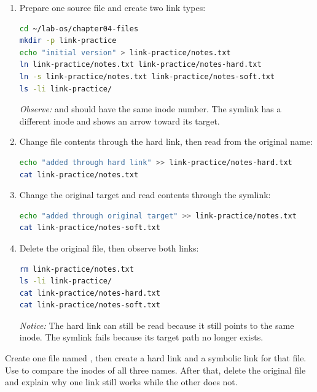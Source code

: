 \begin{enumerate}
    \item Prepare one source file and create two link types:
\begin{lstlisting}[language=bash, caption={Creating a hard link and symbolic link}]
cd ~/lab-os/chapter04-files
mkdir -p link-practice
echo "initial version" > link-practice/notes.txt
ln link-practice/notes.txt link-practice/notes-hard.txt
ln -s link-practice/notes.txt link-practice/notes-soft.txt
ls -li link-practice/
\end{lstlisting}
    \textit{Observe:}  and  should have the same inode number. The symlink has a different inode and shows an arrow toward its target.

    \item Change file contents through the hard link, then read from the original name:
\begin{lstlisting}[language=bash, caption={Changing contents through a hard link}]
echo "added through hard link" >> link-practice/notes-hard.txt
cat link-practice/notes.txt
\end{lstlisting}

    \item Change the original target and read contents through the symlink:
\begin{lstlisting}[language=bash, caption={Reading a target through a symbolic link}]
echo "added through original target" >> link-practice/notes.txt
cat link-practice/notes-soft.txt
\end{lstlisting}

    \item Delete the original file, then observe both links:
\begin{lstlisting}[language=bash, caption={Deleting the original target}]
rm link-practice/notes.txt
ls -li link-practice/
cat link-practice/notes-hard.txt
cat link-practice/notes-soft.txt
\end{lstlisting}
    \textit{Notice:} The hard link can still be read because it still points to the same inode. The symlink fails because its target path no longer exists.
\end{enumerate}

\begin{challengebox}
Create one file named , then create a hard link and a symbolic link for that file. Use  to compare the inodes of all three names. After that, delete the original file and explain why one link still works while the other does not.
\end{challengebox}


